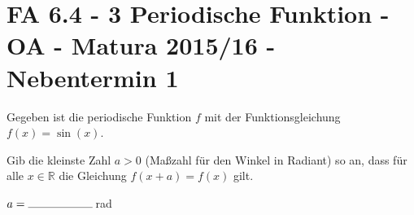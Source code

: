 \section{FA 6.4 - 3 Periodische Funktion - OA - Matura 2015/16 - Nebentermin 1}

\begin{beispiel}[FA 6.4]{1} %
Gegeben ist die periodische Funktion $f$ mit der Funktionsgleichung $f(x) = \sin(x)$. \leer

Gib die kleinste Zahl $a>0$ (Maßzahl für den Winkel in Radiant) so an, dass für alle $x\in \mathbb{R}$ die Gleichung $f(x+a)=f(x)$ gilt. \leer

$a=\rule{2cm}{0.3pt}$\,rad


\end{beispiel}